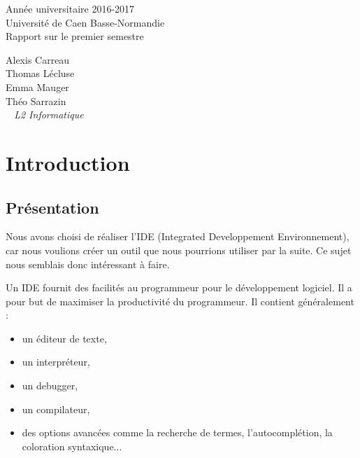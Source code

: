 \documentclass[a4paper,12pt]{article}
\begin{document}
\begin{titlepage}
	\begin{center}
		\Large{Année universitaire 2016-2017}\\
		\Large{Université de Caen Basse-Normandie}\\[1cm]
		
		\huge{Rapport sur le premier semestre}\\
		\vspace{3cm}
		
		Alexis Carreau\\
		Thomas Lécluse\\
		Emma Mauger\\
		Théo Sarrazin\\
		
	\normalsize{\textit{ ~ L2 Informatique}}\\
		\medskip
		\vspace{2cm}
		
	\end{center}
\end{titlepage}

\tableofcontents
\newpage

\section{Introduction}

	\subsection{Présentation}
	Nous avons choisi de réaliser l'IDE (Integrated Developpement Environnement), car nous voulions créer un outil que nous pourrions utiliser par la suite. Ce sujet nous semblais donc intéressant à faire.
	
	Un IDE fournit des facilités au programmeur pour le développement logiciel. Il a pour but de maximiser la productivité du programmeur. Il contient généralement :
	\begin{itemize}
		\item un éditeur de texte, 
		\item un interpréteur, 
		\item un debugger,
		\item un compilateur,
		\item des options avancées comme la recherche de termes, l'autocomplétion, la coloration syntaxique...
	\end{itemize}
	
\end{document}
